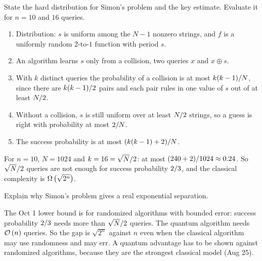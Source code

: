 \begin{exercisebox}
\begin{pproblem}\label{pp:simon-lb}
    State the hard distribution for Simon's problem and the key estimate. Evaluate it for $n = 10$
    and $16$ queries.
\end{pproblem}
\tcblower
\begin{wsolution}
    \leavevmode
    \begin{enumerate}
        \item Distribution: $s$ is uniform among the $N - 1$ nonzero strings, and $f$ is a uniformly
              random $2$-to-$1$ function with period $s$.
        \item An algorithm learns $s$ only from a collision, two queries $x$ and $x \oplus s$.
        \item With $k$ distinct queries the probability of a collision is at most
              $k(k-1)/N$, since there are $k(k-1)/2$ pairs and each pair rules in
              one value of $s$ out of at least $N/2$.
        \item Without a collision, $s$ is still uniform over at least $N/2$ strings, so a
              guess is right with probability at most $2/N$.
        \item The success probability is at most $(k(k-1) + 2)/N$.
    \end{enumerate}
    For $n = 10$, $N = 1024$ and $k = 16 = \sqrt{N}/2$: at most
    $(240 + 2)/1024 \approx 0.24$. So $\sqrt{N}/2$ queries are not enough for
    success probability $2/3$, and the classical complexity is $\Omega\left(\sqrt{2^n}\right)$.
\end{wsolution}
\end{exercisebox}

\begin{exercisebox}
\begin{pproblem}\label{pp:simon-sep}
    Explain why Simon's problem gives a real exponential separation.
\end{pproblem}
\tcblower
\begin{wsolution}
    The Oct 1 lower bound is for randomized algorithms with bounded error: success probability
    $2/3$ needs more than $\sqrt{N}/2$ queries. The quantum algorithm needs
    $\mathcal{O}\left(n\right)$ queries. So the gap is $\sqrt{2^n}$ against $n$ even when the classical algorithm may
    use randomness and may err. A quantum advantage has to be shown against randomized algorithms,
    because they are the strongest classical model (Aug 25).
\end{wsolution}
\end{exercisebox}



